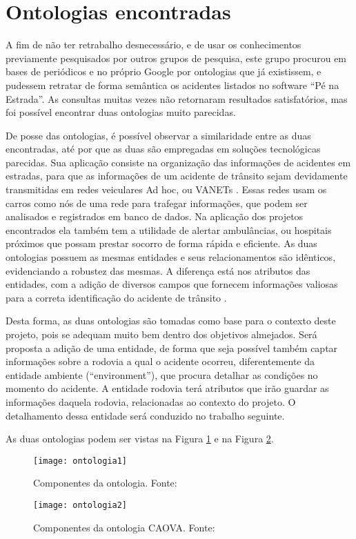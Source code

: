 \section{Ontologias encontradas}

  A fim de não ter retrabalho desnecessário, e de usar os conhecimentos previamente
  pesquisados por outros grupos de pesquisa, este grupo procurou em bases de periódicos e no
  próprio Google por ontologias que já existissem, e pudessem retratar de forma semântica os
  acidentes listados no software “Pé na Estrada”. As consultas muitas vezes não retornaram
  resultados satisfatórios, mas foi possível encontrar duas ontologias muito parecidas.
  
  De posse das ontologias, é possível observar a similaridade entre as duas encontradas,
  até por que as duas são empregadas em soluções tecnológicas parecidas. Sua aplicação
  consiste na organização das informações de acidentes em estradas, para que as informações de
  um acidente de trânsito sejam devidamente transmitidas em redes veiculares Ad hoc, ou
  VANETs \cite{barrachina12}. Essas redes usam os carros como nós de uma rede para
  trafegar informações, que podem ser analisados e registrados em banco de dados. Na
  aplicação dos projetos encontrados ela também tem a utilidade de alertar ambulâncias, ou
  hospitais próximos que possam prestar socorro de forma rápida e eficiente. As duas
  ontologias possuem as mesmas entidades e seus relacionamentos são idênticos, evidenciando
  a robustez das mesmas. A diferença está nos atributos das entidades, com a adição de diversos
  campos que fornecem informações valiosas para a correta identificação do acidente de
  trânsito \cite{villalba14}.
  
  Desta forma, as duas ontologias são tomadas como base para o contexto deste projeto,
  pois se adequam muito bem dentro dos objetivos almejados. Será proposta a adição de uma
  entidade, de forma que seja possível também captar informações sobre a rodovia a qual o
  acidente ocorreu, diferentemente da entidade ambiente (“environment”), que procura detalhar
  as condições no momento do acidente. A entidade rodovia terá atributos que irão guardar as
  informações daquela rodovia, relacionadas ao contexto do projeto. O detalhamento dessa
  entidade será conduzido no trabalho seguinte.
  
  As duas ontologias podem ser vistas na Figura \ref{fig:ontologia1} e na Figura \ref{fig:ontologia2}.
  
  \begin{figure}[!htb]
    \centering
    \texttt{[image: ontologia1]}
    \caption[Componentes da ontologia]{Componentes da ontologia. Fonte: \cite{villalba14}}
    \label{fig:ontologia1}
  \end{figure}
  
    \begin{figure}[!htb]
    \centering
    \texttt{[image: ontologia2]}
    \caption[Componentes da ontologia CAOVA]{Componentes da ontologia CAOVA. Fonte: \cite{barrachina12}}
    \label{fig:ontologia2}
  \end{figure}